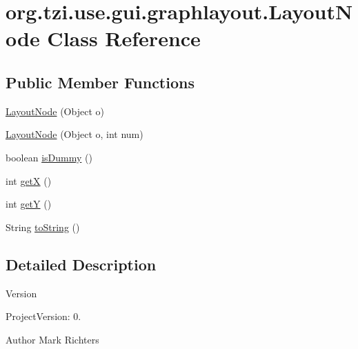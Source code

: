 \hypertarget{classorg_1_1tzi_1_1use_1_1gui_1_1graphlayout_1_1_layout_node}{\section{org.\-tzi.\-use.\-gui.\-graphlayout.\-Layout\-Node Class Reference}
\label{classorg_1_1tzi_1_1use_1_1gui_1_1graphlayout_1_1_layout_node}
}
\subsection*{Public Member Functions}
\begin{DoxyCompactItemize}
\item 
\hyperlink{classorg_1_1tzi_1_1use_1_1gui_1_1graphlayout_1_1_layout_node_ab2ff40abd576870b9afe4a6869cade4c}{Layout\-Node} (Object o)
\item 
\hyperlink{classorg_1_1tzi_1_1use_1_1gui_1_1graphlayout_1_1_layout_node_a763f6c6cfc581ec5188cd76c78335979}{Layout\-Node} (Object o, int num)
\item 
boolean \hyperlink{classorg_1_1tzi_1_1use_1_1gui_1_1graphlayout_1_1_layout_node_ab8d47ff22ae85fedcd8416b4d1e42163}{is\-Dummy} ()
\item 
int \hyperlink{classorg_1_1tzi_1_1use_1_1gui_1_1graphlayout_1_1_layout_node_a523e2f48f72be6a45909b99095854ea6}{get\-X} ()
\item 
int \hyperlink{classorg_1_1tzi_1_1use_1_1gui_1_1graphlayout_1_1_layout_node_a2e968e8c51b4657a459e55bdec5f785f}{get\-Y} ()
\item 
String \hyperlink{classorg_1_1tzi_1_1use_1_1gui_1_1graphlayout_1_1_layout_node_a042ac4453746da0af3918a5a976eb649}{to\-String} ()
\end{DoxyCompactItemize}


\subsection{Detailed Description}
\begin{DoxyVersion}{Version}

\end{DoxyVersion}
\begin{DoxyParagraph}{Project\-Version\-:}
0. 
\end{DoxyParagraph}
\begin{DoxyAuthor}{Author}
Mark Richters 
\end{DoxyAuthor}


